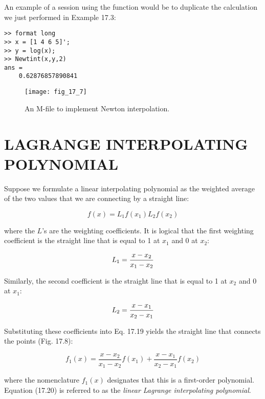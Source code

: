 \documentclass[../main.tex]{subfiles}
\begin{document}
An example of a session using the function would be to duplicate the calculation we
just performed in Example 17.3:

\begin{lstlisting}[numbers=none]
>> format long
>> x = [1 4 6 5]';
>> y = log(x);
>> Newtint(x,y,2)
ans =
	0.62876857890841
\end{lstlisting}

\begin{figure}[H] 
	\centering
	\texttt{[image: fig\_17\_7]}
	\caption{\textsf{An M-file to implement Newton interpolation.}}
	\label{fig:fig_17_7}
\end{figure}

\label{cha:cha_P_17_3}
\section{LAGRANGE INTERPOLATING POLYNOMIAL}

\noindent Suppose we formulate a linear interpolating polynomial as the weighted average of the two
values that we are connecting by a straight line:

\begin{equation}
	\tag{17.19}
	f(x) = L_1 f(x_1) L_2 f(x_2)
\end{equation}

\noindent where the $L$'s are the weighting coefficients. It is logical that the first weighting coefficient
is the straight line that is equal to 1 at $x_1$ and 0 at $x_2$:

\begin{equation}
	\notag
	L_1 = \frac{x - x_2}{x_1 - x_2}
\end{equation}

\noindent Similarly, the second coefficient is the straight line that is equal to 1 at $x_2$ and 0 at $x_1$:

\begin{equation}
	\notag
	L_2 = \frac{x - x_1}{x_2 - x_1}
\end{equation}

\noindent Substituting these coefficients into Eq. 17.19 yields the straight line that connects the
points (Fig. 17.8):

\begin{equation}
	\tag{17.20}
	f_1(x) = \frac{x - x_2}{x_1 - x_2} f(x_1) + \frac{x - x_1}{x_2 - x_1} f(x_2)
\end{equation}

\noindent where the nomenclature $f_1(x)$ designates that this is a first-order polynomial. Equation (17.20) is referred to as the \textit{linear Lagrange interpolating polynomial}.
\end{document}
